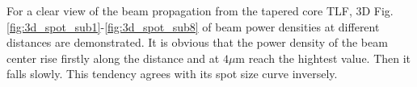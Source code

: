 For a clear view of the beam propagation from the tapered core TLF, 3D Fig.\quad\ref{fig:3d_spot_sub1}-\ref{fig:3d_spot_sub8} of beam power densities at different distances are demonstrated. It is obvious that the power density of the beam center rise firstly along the distance and at $4\mu$m reach the hightest value. Then it falls slowly. This tendency agrees with its spot size curve inversely. 
\begin{figure}[!ht]
\setlength{\abovecaptionskip}{0pt}%
\flushleft
\end{figure}	
